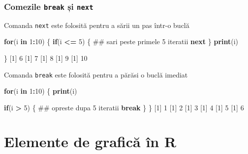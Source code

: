 \documentclass[]{article}
\newenvironment{Shaded}{\begin{snugshade}}{\end{snugshade}}
\newcommand{\KeywordTok}[1]{\textcolor[rgb]{0.13,0.29,0.53}{\textbf{#1}}}
\newcommand{\DecValTok}[1]{\textcolor[rgb]{0.00,0.00,0.81}{#1}}
\newcommand{\StringTok}[1]{\textcolor[rgb]{0.31,0.60,0.02}{#1}}
\newcommand{\ControlFlowTok}[1]{\textcolor[rgb]{0.13,0.29,0.53}{\textbf{#1}}}
\newcommand{\OperatorTok}[1]{\textcolor[rgb]{0.81,0.36,0.00}{\textbf{#1}}}
\newcommand{\NormalTok}[1]{#1}
\begin{document}
\subsubsection{\texorpdfstring{Comezile \texttt{break} și
\texttt{next}}{Comezile break și next}}\label{comezile-break-si-next}

Comanda \texttt{next} este folosită pentru a sării un pas într-o buclă

\begin{Shaded}
\begin{Highlighting}[]
\ControlFlowTok{for}\NormalTok{(i }\ControlFlowTok{in} \DecValTok{1}\OperatorTok{:}\DecValTok{10}\NormalTok{) \{}
        \ControlFlowTok{if}\NormalTok{(i }\OperatorTok{<=}\StringTok{ }\DecValTok{5}\NormalTok{) \{}
\NormalTok{                ## sari peste primele 5 iteratii}
                \ControlFlowTok{next}                 
\NormalTok{        \}}
  \KeywordTok{print}\NormalTok{(i)}
        
\NormalTok{\}}
\NormalTok{[}\DecValTok{1}\NormalTok{] }\DecValTok{6}
\NormalTok{[}\DecValTok{1}\NormalTok{] }\DecValTok{7}
\NormalTok{[}\DecValTok{1}\NormalTok{] }\DecValTok{8}
\NormalTok{[}\DecValTok{1}\NormalTok{] }\DecValTok{9}
\NormalTok{[}\DecValTok{1}\NormalTok{] }\DecValTok{10}
\end{Highlighting}
\end{Shaded}

Comanda \texttt{break} este folosită pentru a părăsi o buclă imediat

\begin{Shaded}
\begin{Highlighting}[]
\ControlFlowTok{for}\NormalTok{(i }\ControlFlowTok{in} \DecValTok{1}\OperatorTok{:}\DecValTok{10}\NormalTok{) \{}
      \KeywordTok{print}\NormalTok{(i)}

      \ControlFlowTok{if}\NormalTok{(i }\OperatorTok{>}\StringTok{ }\DecValTok{5}\NormalTok{) \{}
\NormalTok{              ## opreste dupa 5 iteratii}
              \ControlFlowTok{break}  
\NormalTok{      \}     }
\NormalTok{\}}
\NormalTok{[}\DecValTok{1}\NormalTok{] }\DecValTok{1}
\NormalTok{[}\DecValTok{1}\NormalTok{] }\DecValTok{2}
\NormalTok{[}\DecValTok{1}\NormalTok{] }\DecValTok{3}
\NormalTok{[}\DecValTok{1}\NormalTok{] }\DecValTok{4}
\NormalTok{[}\DecValTok{1}\NormalTok{] }\DecValTok{5}
\NormalTok{[}\DecValTok{1}\NormalTok{] }\DecValTok{6}
\end{Highlighting}
\end{Shaded}

\section{Elemente de grafică în R}\label{elemente-de-grafica-in-r}
\end{document}
